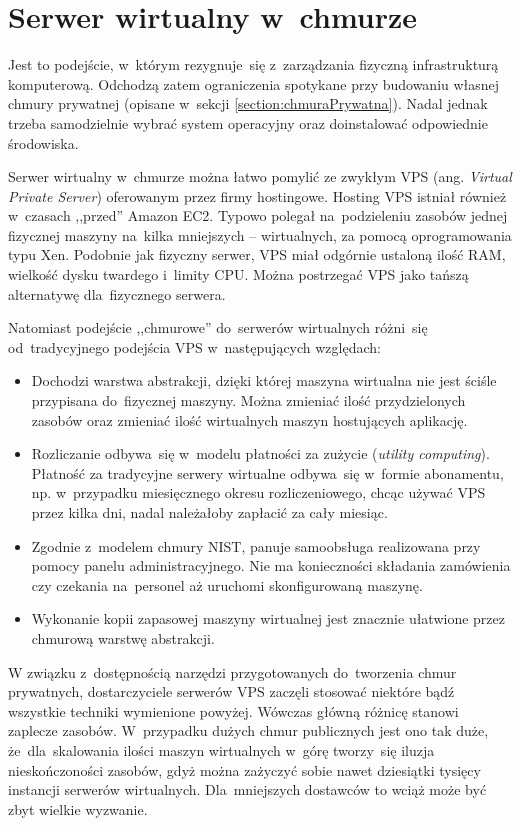 \documentclass[12pt,a4paper,twoside,titlepage,openright]{book}
\begin{document}
\section{Serwer wirtualny w~chmurze}\label{section:podejscieVm}

Jest to podejście, w~którym rezygnuje~się z~zarządzania fizyczną infrastrukturą komputerową. Odchodzą zatem ograniczenia spotykane przy budowaniu własnej chmury prywatnej (opisane w~sekcji  \ref{section:chmuraPrywatna}). Nadal jednak trzeba samodzielnie wybrać system operacyjny oraz doinstalować odpowiednie środowiska.

Serwer wirtualny w~chmurze można łatwo pomylić ze zwykłym VPS (ang. \textit{Virtual Private Server}) oferowanym przez firmy hostingowe. Hosting VPS istniał również w~czasach ,,przed'' Amazon EC2. Typowo polegał na~podzieleniu zasobów jednej fizycznej maszyny na~kilka mniejszych -- wirtualnych, za pomocą oprogramowania typu Xen. Podobnie jak fizyczny serwer, VPS miał odgórnie ustaloną ilość RAM, wielkość dysku twardego i~limity CPU. Można postrzegać VPS jako tańszą alternatywę dla~fizycznego serwera. 

Natomiast podejście ,,chmurowe'' do~serwerów wirtualnych różni~się od~tradycyjnego podejścia VPS w~następujących względach:
\begin{itemize}
\item Dochodzi warstwa abstrakcji, dzięki której maszyna wirtualna nie jest ściśle przypisana do~fizycznej maszyny. Można zmieniać ilość przydzielonych zasobów oraz zmieniać ilość wirtualnych maszyn hostujących aplikację.
\item Rozliczanie odbywa~się w~modelu płatności za zużycie (\textit{utility computing}). Płatność za tradycyjne serwery wirtualne odbywa~się w~formie abonamentu, np. w~przypadku miesięcznego okresu rozliczeniowego, chcąc używać VPS przez kilka dni, nadal należałoby zapłacić za cały miesiąc.
\item Zgodnie z~modelem chmury NIST, panuje samoobsługa realizowana przy pomocy panelu administracyjnego. Nie ma konieczności składania zamówienia czy czekania na~personel aż uruchomi skonfigurowaną maszynę.
\item Wykonanie kopii zapasowej maszyny wirtualnej jest znacznie ułatwione przez chmurową warstwę abstrakcji. 
\end{itemize}

W związku z~dostępnością narzędzi przygotowanych do~tworzenia chmur prywatnych, dostarczyciele serwerów VPS zaczęli stosować niektóre bądź wszystkie techniki wymienione powyżej. Wówczas główną różnicę stanowi zaplecze zasobów. W~przypadku dużych chmur publicznych jest ono tak duże, że~dla~skalowania ilości maszyn wirtualnych w~górę tworzy~się iluzja nieskończoności zasobów, gdyż można zażyczyć sobie nawet dziesiątki tysięcy instancji serwerów wirtualnych. Dla~mniejszych dostawców to wciąż może być zbyt wielkie wyzwanie.
\end{document}
